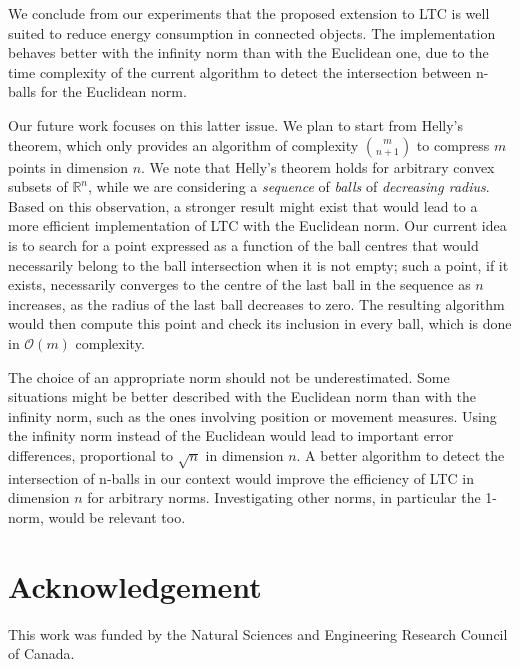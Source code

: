 \documentclass[10pt, conference, compsocconf]{IEEEtran}
\begin{document}
We conclude from our experiments that the proposed extension to LTC is 
well suited to reduce energy consumption in connected objects. The 
implementation behaves better with the infinity norm than with the 
Euclidean one, due to the time complexity of the current algorithm to 
detect the intersection between n-balls for the Euclidean norm. 

Our future work focuses on this latter issue. We plan to start from 
Helly's theorem, which only provides an algorithm of complexity ${m 
\choose n+1}$ to compress $m$ points in 
dimension $n$. We note that Helly's theorem holds for arbitrary convex 
subsets of $\mathbb{R}^n$, while we are considering a \emph{sequence} 
of \emph{balls} of \emph{decreasing radius}. Based on this 
observation, a stronger result might exist that would lead to a more 
efficient implementation of LTC with the Euclidean norm. Our current 
idea is to search for a point expressed as a function of the ball centres that would 
necessarily belong to the ball intersection when it is not empty; such 
a point, if it exists, necessarily converges to the centre of the last 
ball in the sequence as $n$ increases, as the radius of the last ball 
decreases to zero. The resulting algorithm would then compute this 
point and check its inclusion in every ball, which is done in 
$\mathcal{O}(m)$ complexity.

The choice of an appropriate norm should not be underestimated. Some 
situations might be better described with the Euclidean norm than with 
the infinity norm, such as the ones involving position or movement 
measures. Using the infinity norm instead of the Euclidean would lead 
to important error differences, proportional to $\sqrt{n}$ in dimension 
$n$. A better algorithm to detect the intersection of n-balls in our 
context would improve the efficiency of 
LTC in dimension $n$ for arbitrary norms. Investigating other norms, in 
particular the 1-norm, would be relevant too.

\section*{Acknowledgement}
This work was funded by the Natural 
Sciences and Engineering Research Council of Canada.



\end{document}
